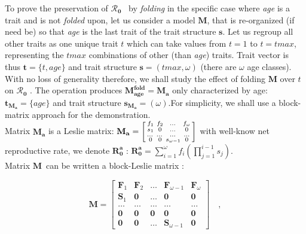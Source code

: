 \documentclass[10pt,a4paper]{article}
\newcommand{\M}{$\mathbf{M}$}
\newcommand{\Rzero}{$\boldsymbol{\mathcal{R}_{0}}$  }
\begin{document}
To prove the preservation of \Rzero\ by \emph{folding} in the specific case where \emph{age} is a trait and is not \emph{folded} upon, let us consider a model \M, that is re-organized (if need be) so that \emph{age} is the last trait of the trait structure $\mathbf{s}$. Let us regroup all other traits as one unique trait $t$ which can take values from $t=1$ to $t=tmax$, representing the $tmax$ combinations of other (than \emph{age}) traits. Trait vector is thus $\mathbf{t}=\lbrace t,age \rbrace$ and trait structure $\mathbf{s}=(tmax,\omega)$ (there are $\omega$ age classes). With no loss of generality therefore, we shall study the effect of folding  $\mathbf{M}$ over $t$ on \Rzero. The operation produces $\mathbf{M^{fold}_{age}}=\mathbf{M_{a}}$ only characterized by age: $\mathbf{t_{\mathbf{M_{a}}}}=\lbrace age \rbrace$ and trait structure $\mathbf{s_{\mathbf{M_{a}}}}=(\omega)$.For simplicity, we shall use a block-matrix approach for the demonstration. \\

Matrix $\mathbf{M_a}$ is a Leslie matrix: $\mathbf{M_a}=\begin{bsmallmatrix}
f_1 & f_2 & \dots & f_{\omega} \\s_1 & 0 & \dots & 0 \\\dots & \dots &\dots &\dots \\ 0 & 0 & s_{\omega-1} & 0
\end{bsmallmatrix}$ with well-know net reproductive rate, we denote $\mathbf{R_0^{a}}$  : $\mathbf{R_0^{a}}=\sum_{i=1}^{\omega}  f_{i}(\prod_{j=1}^{i-1}s_{j})$.\\

Matrix \M\ can be written a block-Leslie matrix :

\[ \mathbf{M}=
\left[ \begin{array}{c|c|c|c|c}
 \mathbf{F}_{1} & \mathbf{F}_{2} & \dots & \mathbf{F}_{\omega-1}  & \mathbf{F}_{\omega}  \\
\hline
 \mathbf{S}_{1} & \mathbf{0} & \dots & \mathbf{0} & \mathbf{0}  \\
 \hline
 \dots & \dots& \dots  &  \dots  &  \dots \\
\hline
 \mathbf{0}  &  \mathbf{0} &  \mathbf{0}   &   \mathbf{0}   &   \mathbf{0}  \\
 \hline
 \mathbf{0} & \mathbf{0} & \dots & \mathbf{S}_{\omega-1} & \mathbf{0}
 \end{array}
\right]  \quad ,
\]
\end{document}
